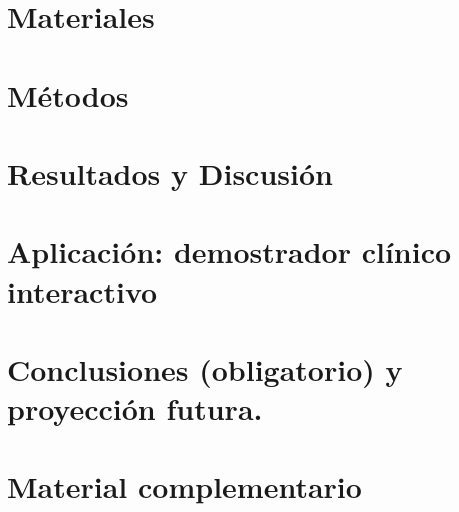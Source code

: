 \documentclass[twoside,spanish,a4paper,12pt]{tfg}
\begin{document}
\chapter{Materiales}


\chapter{Métodos}


\chapter{Resultados y Discusión}


\chapter{Aplicación: demostrador clínico interactivo}


\chapter{Conclusiones (obligatorio) y proyección futura. }






\appendix
{}
\chapter{Material complementario}

\end{document}
